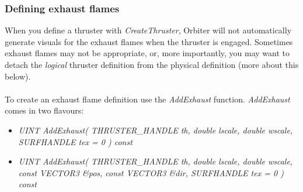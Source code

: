 \documentclass[Orbiter Developer Manual.tex]{subfiles}
\begin{document}
\subsubsection{Defining exhaust flames}
When you define a thruster with \textit{CreateThruster}, Orbiter will not automatically generate visuals for the exhaust flames when the thruster is engaged. Sometimes exhaust flames may not be appropriate, or, more importantly, you may want to detach the \textit{logical} thruster definition from the physical definition (more about this below).\\
\\
To create an exhaust flame definition use the \textit{AddExhaust} function. \textit{AddExhaust} comes in two flavours:
\begin{itemize}
\item \textit{UINT AddExhaust( THRUSTER\_HANDLE th, double lscale, double wscale, SURFHANDLE tex = 0 ) const}
\item \textit{UINT AddExhaust( THRUSTER\_HANDLE th, double lscale, double wscale, const VECTOR3 \&pos, const VECTOR3 \&dir, SURFHANDLE tex = 0 ) const}
\end{itemize}
\end{document}
